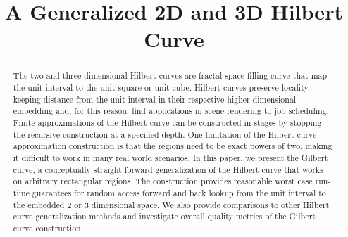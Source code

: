 \documentclass[
twocolumn,
]{ceurart}
\begin{document}



\title{ A Generalized 2D and 3D Hilbert Curve }



\begin{abstract}
The two and three dimensional Hilbert curves are fractal space filling curve that
map the unit interval to the unit square or unit cube.
Hilbert curves preserve locality, keeping distance from the unit interval
in their respective higher dimensional embedding and, for this reason,
find applications in scene rendering to job scheduling.
Finite approximations of the Hilbert curve can be constructed in stages
by stopping the recursive construction at a specified depth.
One limitation of the Hilbert curve approximation construction is that the regions need
to be exact powers of two, making it difficult to work in many real world
scenarios.
In this paper, we present the Gilbert curve,
a conceptually straight forward generalization of the Hilbert curve
that works on arbitrary rectangular regions.
The construction provides reasonable worst case run-time guarantees for random
access forward and back lookup from the unit interval to the embedded 2 or 3 dimensional
space.
We also provide comparisons to other Hilbert curve generalization methods
and investigate overall quality metrics of the Gilbert curve construction.
\end{abstract}

\maketitle

\newcommand{\specialcell}[2][c]{\begin{tabular}[#1]{@{}l@{}}#2\end{tabular}}
\newcommand{\specialcellCenter}[2][c]{\begin{tabular}[#1]{@{}c@{}}#2\end{tabular}}








%


\appendix

\end{document}
